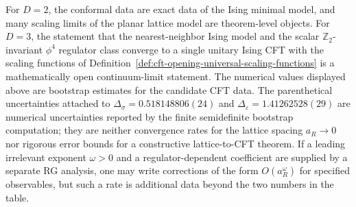 \begin{remark}
\label{rem:cft-opening-ising-scaling-function-status}
For \(D=2\), the conformal data are exact data of the Ising minimal model, and
many scaling limits of the planar lattice model are theorem-level objects.  For
\(D=3\), the statement that the nearest-neighbor Ising model and the scalar
\(\mathbb Z_2\)-invariant \(\phi^4\) regulator class converge to a single
unitary Ising CFT with the scaling functions of
Definition~\ref{def:cft-opening-universal-scaling-functions} is a
mathematically open continuum-limit statement.  The numerical values displayed
above are bootstrap estimates for the candidate CFT data.  The parenthetical
uncertainties attached to
\(\Delta_\sigma=0.518148806(24)\) and
\(\Delta_\varepsilon=1.41262528(29)\) are numerical uncertainties reported by
the finite semidefinite bootstrap computation; they are neither convergence
rates for the lattice spacing \(a_R\to0\) nor rigorous error bounds for a
constructive lattice-to-CFT theorem.  If a leading irrelevant exponent
\(\omega>0\) and a regulator-dependent coefficient are supplied by a separate
RG analysis, one may write corrections of the form \(O(a_R^\omega)\) for
specified observables, but such a rate is additional data beyond the two
numbers in the table.
\end{remark}

